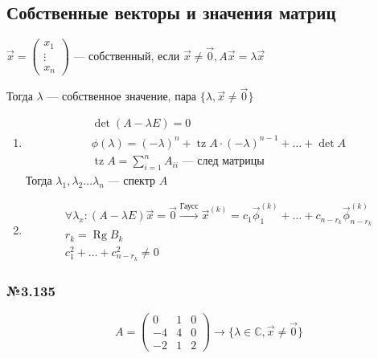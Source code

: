 \documentclass{article}
\DeclareMathOperator*{\Rg}{Rg}
\DeclareMathOperator*{\Tz}{tz}
\begin{document}
\subsection{Собственные векторы и значения матриц}

$\vec{x} = \begin{pmatrix}x_1 \\ \vdots \\ x_n\end{pmatrix}$ --- собственный, если
$\vec{x} \ne \vec{0}, A\vec{x} = \lambda \vec{x}$

Тогда $\lambda$ --- собственное значение, пара $\{\lambda, \vec{x} \ne \vec{0} \}$

\begin{enumerate}
	\item \begin{gather*}
		\det(A - \lambda E) = 0 \\
		\phi (\lambda) = (-\lambda)^n + \Tz A \cdot (-\lambda)^{n-1} + \dots + \det A \\
		\Tz A = \sum_{i=1}^{n} A_{ii} \text{ --- след матрицы}
	\end{gather*}
	Тогда $\lambda_1, \lambda_2 \dots \lambda_n$ --- спектр $A$
	\item \begin{gather*}
		\forall \lambda_x : (A - \lambda E) \vec{x} = \vec{0} \stackrel{\text{Гаусс}}{\rightarrow}
		\vec{x}^{(k)} = c_1 \vec{\phi}_1^{(k)} + \dots + c_{n-r_k} \vec{\phi}_{n-r_k}^{(k)} \\
		r_k = \Rg B_k \\
		c_1^2 + \dots + c_{n-r_k}^2 \ne 0
	\end{gather*}
\end{enumerate}

\subsubsection*{№3.135}

\[
	A = \begin{pmatrix}
		0 & 1 & 0 \\
		-4 & 4 & 0 \\
		-2 & 1 & 2
	\end{pmatrix} \rightarrow \{ \lambda \in \mathbb{C}, \vec{x} \ne \vec{0} \}
\]
\end{document}
